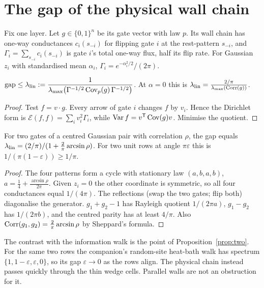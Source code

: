 \section{The gap of the physical wall chain}\label{sec:gap}

Fix one layer. Let $g\in\{0,1\}^n$ be its gate vector with law $p$. Its wall chain has one-way conductances $c_i(s_{-i})$
for flipping gate $i$ at the rest-pattern $s_{-i}$, and $\Gamma_i=\sum_{s_{-i}}c_i(s_{-i})$ is gate $i$'s total one-way
flux, half its flip rate. For Gaussian $z_i$ with standardised mean $\alpha_i$, $\Gamma_i=e^{-\alpha_i^2/2}/(2\pi)$.

\begin{proposition}\label{prop:lin}
$\displaystyle\operatorname{gap}\le\lambda_{\rm lin}:=\frac1{\lambda_{\max}\big(\Gamma^{-1/2}\operatorname{Cov}_p(g)\,\Gamma^{-1/2}\big)}$.
At $\alpha=0$ this is $\lambda_{\rm lin}=\frac{2/\pi}{\lambda_{\max}(\operatorname{Corr}(g))}$.
\end{proposition}
\begin{proof}
Test $f=v\cdot g$. Every arrow of gate $i$ changes $f$ by $v_i$. Hence the Dirichlet form is
$\mathcal E(f,f)=\sum_iv_i^2\Gamma_i$, while $\operatorname{Var}f=v^{\mathsf T}\operatorname{Cov}(g)v$. Minimise the quotient.
\end{proof}

\begin{proposition}\label{prop:two}
For two gates of a centred Gaussian pair with correlation $\rho$, the gap equals $\lambda_{\rm lin}=(2/\pi)/(1+\tfrac2\pi
\arcsin\rho)$. For two unit rows at angle $\pi\varepsilon$ this is $1/(\pi(1-\varepsilon))\ge1/\pi$.
\end{proposition}
\begin{proof}
The four patterns form a cycle with stationary law $(a,b,a,b)$, $a=\frac14+\frac{\arcsin\rho}{2\pi}$. Given $z_i=0$ the
other coordinate is symmetric, so all four conductances equal $1/(4\pi)$. The reflections (swap the two gates; flip both)
diagonalise the generator. $g_1+g_2-1$ has Rayleigh quotient $1/(2\pi a)$, $g_1-g_2$ has $1/(2\pi b)$, and the centred
parity has at least $4/\pi$. Also $\operatorname{Corr}(g_1,g_2)=\frac2\pi\arcsin\rho$ by Sheppard's formula.
\end{proof}

The contrast with the information walk is the point of Proposition~\ref{prop:two}. For the same two rows the companion's
random-site heat-bath walk has spectrum $\{1,1-\varepsilon,\varepsilon,0\}$, so its gap $\varepsilon\to0$ as the rows
align. The physical chain instead passes quickly through the thin wedge cells. Parallel walls are not an obstruction for
it.

